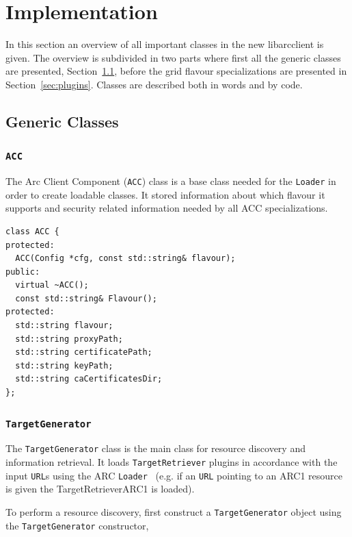 \documentclass{book}
\newcommand{\arclib}{libarcclient}
\newcommand{\ACC}{\texttt{ACC}}
\newcommand{\Loader}{\texttt{Loader}}
\newcommand{\TargetGenerator}{\texttt{TargetGenerator}}
\newcommand{\TargetRetriever}{\texttt{TargetRetriever}}
\newcommand{\URL}{\texttt{URL}}
\begin{document}
\chapter{Implementation}
\label{sec:Implementation}

In this section an overview of all important classes in the new
{\arclib} is given. The overview is subdivided in two parts where
first all the generic classes are presented,
Section~\ref{sec:genclass}, before the grid flavour specializations
are presented in Section~\ref{sec:plugins}. Classes are described both
in words and by code.

\section{Generic Classes}
\label{sec:genclass}

\subsection{{\ACC}}

The Arc Client Component ({\ACC}) class is a base class needed for the
{\Loader} in order to create loadable classes. It stored information
about which flavour it supports and security related information
needed by all ACC specializations.

\begin{shaded}
\begin{verbatim}
class ACC {
protected:
  ACC(Config *cfg, const std::string& flavour);
public:
  virtual ~ACC();
  const std::string& Flavour();
protected:
  std::string flavour;
  std::string proxyPath;
  std::string certificatePath;
  std::string keyPath;
  std::string caCertificatesDir;
};
\end{verbatim}
\end{shaded}

\subsection{{\TargetGenerator}}

 The {\TargetGenerator} class is the main class for resource discovery
 and information retrieval. It loads {\TargetRetriever} plugins in
 accordance with the input {\URL}s using the ARC {\Loader}~\cite{hed}
 (e.g. if an {\URL} pointing to an ARC1 resource is given the
 TargetRetrieverARC1 is loaded).

To perform a resource discovery, first construct a {\TargetGenerator}
object using the {\TargetGenerator} constructor,
\end{document}
